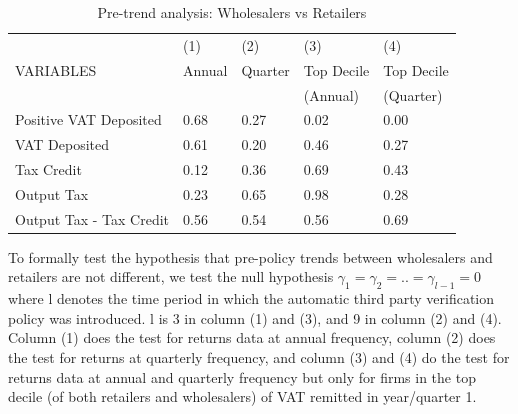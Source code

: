 

\begin{table}[h]
\footnotesize
\begin{threeparttable}
\begin{tabular}{lllll} \hline \hline
 & (1) & (2) & (3) & (4) \\
VARIABLES & Annual & Quarter & Top Decile &Top Decile  \\ 
 &  &  & (Annual) & (Quarter)  \\ \hline
Positive VAT Deposited & 0.68  & 0.27 & 0.02 &0.00 \\
VAT Deposited & 0.61 &  0.20 & 0.46 &0.27 \\
Tax Credit & 0.12 & 0.36 & 0.69 & 0.43 \\
Output Tax & 0.23 & 0.65 & 0.98 & 0.28 \\
Output Tax - Tax Credit & 0.56 & 0.54 & 0.56 & 0.69 \\ \hline
\end{tabular}
\begin{tablenotes}
To formally test the hypothesis that pre-policy trends between wholesalers and retailers are not different, we test the null hypothesis $\gamma_1=\gamma_2=..=\gamma_{l-1}=0$ where l denotes the time period in which the automatic third party verification policy was introduced. l is 3 in column (1) and (3), and 9 in column (2) and (4). Column (1) does the test for returns data at annual frequency, column (2) does the test for returns at quarterly frequency, and column (3) and (4) do the test for returns data at annual and quarterly frequency but only for firms in the top decile (of both retailers and wholesalers) of VAT remitted in year/quarter 1.
\end{tablenotes}
\caption{Pre-trend analysis: Wholesalers vs Retailers}
\label{tbl:}
\end{threeparttable}
\end{table}

\pagebreak

